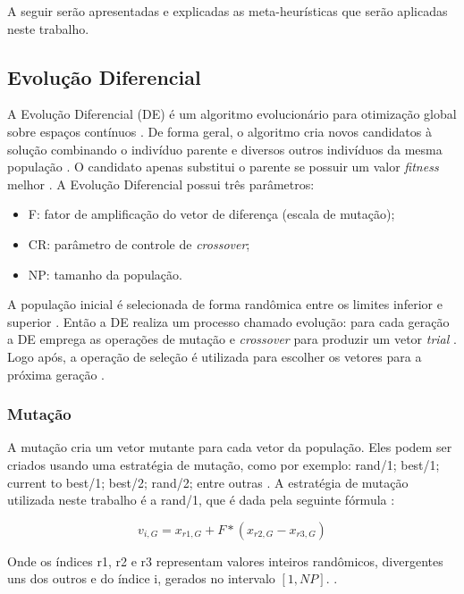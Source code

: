 A seguir serão apresentadas e explicadas as meta-heurísticas que serão aplicadas neste trabalho.

\subsection{Evolução Diferencial}

A Evolução Diferencial (DE) é um algoritmo evolucionário para otimização global sobre espaços contínuos \cite{brest}. De forma geral, o algoritmo cria novos candidatos à solução combinando o indivíduo parente e diversos outros indivíduos da mesma população \cite{brest}. O candidato apenas substitui o parente se possuir um valor \textit{fitness} melhor \cite{brest}. A Evolução Diferencial possui três parâmetros:

\begin{itemize}
    \item F: fator de amplificação do vetor de diferença (escala de mutação);
    \item CR: parâmetro de controle de \textit{crossover};
    \item NP: tamanho da população.
\end{itemize}

A população inicial é selecionada de forma randômica entre os limites inferior e superior \cite{brest}. Então a DE realiza um processo chamado evolução: para cada geração a DE emprega as operações de mutação e \textit{crossover} para produzir um vetor \textit{trial} \cite{brest}. Logo após, a operação de seleção é utilizada para escolher os vetores para a próxima geração \cite{brest}. 

\subsubsection{Mutação}

A mutação cria um vetor mutante para cada vetor da população. Eles podem ser criados usando uma estratégia de mutação, como por exemplo: rand/1; best/1; current to best/1; best/2; rand/2; entre outras \cite{brest}. A estratégia de mutação utilizada neste trabalho é a rand/1, que é dada pela seguinte fórmula \cite{brest}:

\begin{equation}
v_{i,G} =  x_{r1,G} + F * (x_{r2,G} - x_{r3,G}) 
\end{equation}

Onde os índices r1, r2 e r3 representam valores inteiros randômicos, divergentes uns dos outros e do índice i, gerados no intervalo $[1, NP]$. \cite{brest}.

